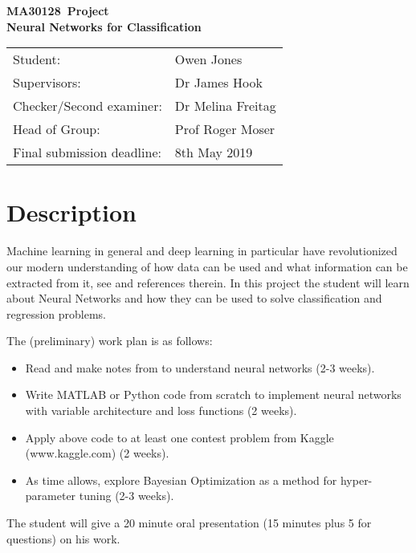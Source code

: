 \documentclass[10pt]{article}
\begin{document}
\thispagestyle{empty}
\newcommand{\Title}{}
\newcommand{\Student}{Owen Jones}
\newcommand{\Supervisor}{Dr James Hook}   %
\newcommand{\Checker}{Dr Melina Freitag}
\newcommand{\HoG}{Prof Roger Moser}
\newcommand{\Unit}{MA30128} 
\newcommand{\Deadline}{8th May 2019}

\setlength{\topsep}{0pt}
\setlength{\partopsep}{0pt}
\setlength{\parindent}{0pt}
\setlength{\parskip}{6pt}

\begin{center}
\bfseries{\Large \Unit\ Project}\\[6pt]
\large\Title Neural Networks for Classification \end{center}
\medskip
\begin{center}
\begin{tabular}{ll}
Student:&\Student\\
Supervisors:&\Supervisor\\
Checker/Second examiner:&\Checker\\
Head of Group:&\HoG\\
Final submission deadline:&\Deadline
\end{tabular}
\end{center}
\vspace{-0.4cm}
\section*{Description}

Machine learning in general and deep learning in particular have revolutionized our modern understanding of how data can be used and what information can be extracted from it, see \cite{Higham2} and references therein. In this project the student will learn about Neural Networks and how they can be used to solve classification and regression problems. 

The (preliminary) work plan is as follows:
\begin{itemize}
\item Read and make notes from \cite{Higham2} to understand neural networks (2-3 weeks).
\item Write MATLAB or Python code from scratch to implement neural networks with variable architecture and loss functions  (2 weeks).
\item Apply above code to at least one contest problem from Kaggle (www.kaggle.com) (2 weeks).
\item As time allows, explore Bayesian Optimization as a method for hyper-parameter tuning \cite{bp,ar} (2-3 weeks).
\end{itemize}
The student will give a 20 minute oral presentation (15 minutes plus 5 for questions) on his work. 
\end{document}
